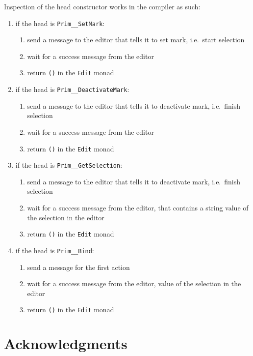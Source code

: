 \documentclass[sigplan, authordraft]{acmart}
\newcommand{\IdrisData}[1]{\textcolor{IdrisRed}{#1}}
\newcommand{\IdrisType}[1]{\textcolor{IdrisBlue}{#1}}
\newcommand{\ty}[1]{\IdrisType{\texttt{#1}}}
\newcommand{\dt}[1]{\IdrisData{\texttt{#1}}}
\newcommand{\Prim}[1]{\dt{Prim\_\_#1}}
\newcommand{\TODO}[1]{{\color{red}{[TODO: #1]}}}
\begin{document}
Inspection of the head constructor works in the compiler as such:
\begin{enumerate}
  \item if the head is \Prim{SetMark}:
    \begin{enumerate}[label=(\alph*)]
      \item send a message to the editor that tells it to set mark, i.e.\ start selection
      \item wait for a success message from the editor
      \item return \dt{()} in the \ty{Edit} monad
    \end{enumerate}
  \item if the head is \Prim{DeactivateMark}:
    \begin{enumerate}[label=(\alph*)]
      \item send a message to the editor that tells it to deactivate mark, i.e.\ finish selection
      \item wait for a success message from the editor
      \item return \dt{()} in the \ty{Edit} monad
    \end{enumerate}
  \item if the head is \Prim{GetSelection}:
    \begin{enumerate}[label=(\alph*)]
      \item send a message to the editor that tells it to deactivate mark, i.e.\ finish selection
      \item wait for a success message from the editor, that contains a string
        value of the selection in the editor
      \item return \dt{()} in the \ty{Edit} monad
    \end{enumerate}
  \item if the head is \Prim{Bind}:
    \begin{enumerate}[label=(\alph*)]
      \item send a message for the first action
      \item wait for a success message from the editor,
        value of the selection in the editor
      \item return \dt{()} in the \ty{Edit} monad
    \end{enumerate}
\end{enumerate}


\TODO{the whole spiel about how the compiler is a server }

% 
% 
% 
% 
% 
% 

\section*{Acknowledgments}

\TODO{We would like to thank ...}



\end{document}
